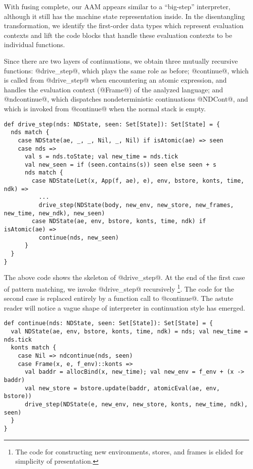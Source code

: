 \documentclass[acmsmall]{acmart}\settopmatter{}
\begin{document}
With fusing complete, our AAM
appears similar to a ``big-step'' interpreter, although it still has the machine
state representation inside.
In the disentangling transformation, we
identify the first-order data types which represent evaluation contexts
and lift the code blocks that handle these evaluation contexts to be individual functions.

Since there are two layers of continuations,
we obtain three mutually recursive functions: @drive_step@, which plays the same
role as before; @continue@, which is called from @drive_step@ when encountering an atomic 
expression, and handles the evaluation context (@Frame@) of the analyzed
language; and @ndcontinue@, which dispatches nondeterministic continuations @NDCont@,
and which is invoked from @continue@ when the normal stack is empty.

\begin{lstlisting}
def drive_step(nds: NDState, seen: Set[State]): Set[State] = {
  nds match {
    case NDState(ae, _, _, Nil, _, Nil) if isAtomic(ae) => seen
    case nds =>
      val s = nds.toState; val new_time = nds.tick
      val new_seen = if (seen.contains(s)) seen else seen + s
      nds match {
        case NDState(Let(x, App(f, ae), e), env, bstore, konts, time, ndk) =>
          ...
          drive_step(NDState(body, new_env, new_store, new_frames, new_time, new_ndk), new_seen)
        case NDState(ae, env, bstore, konts, time, ndk) if isAtomic(ae) =>
          continue(nds, new_seen)
      }
  }
}
\end{lstlisting}

The above code shows the skeleton of @drive_step@.
At the end of the first case of pattern matching, we invoke @drive_step@ recursively 
\footnote{The code for constructing new environments, stores, and frames is elided for 
simplicity of presentation.}.
The code for the second case is replaced entirely by a function call to @continue@.
The astute reader will notice a vague shape of interpreter in continuation style has emerged.

\begin{lstlisting}
def continue(nds: NDState, seen: Set[State]): Set[State] = {
  val NDState(ae, env, bstore, konts, time, ndk) = nds; val new_time = nds.tick
  konts match {
    case Nil => ndcontinue(nds, seen)
    case Frame(x, e, f_env)::konts =>
      val baddr = allocBind(x, new_time); val new_env = f_env + (x -> baddr)
      val new_store = bstore.update(baddr, atomicEval(ae, env, bstore))
      drive_step(NDState(e, new_env, new_store, konts, new_time, ndk), seen)
  }
}
\end{lstlisting}
\end{document}
